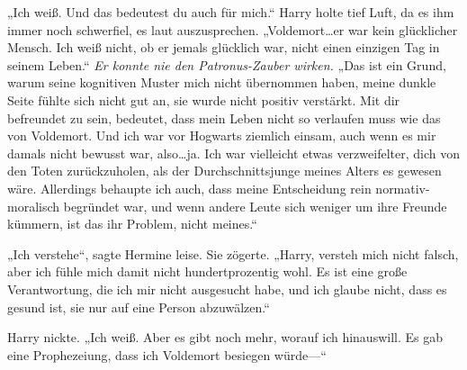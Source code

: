„Ich weiß. Und das bedeutest du auch für mich.“
Harry holte tief Luft, da es ihm immer noch schwerfiel, es laut auszusprechen.
„Voldemort…er war kein glücklicher Mensch. Ich weiß nicht, ob er jemals glücklich war, nicht einen einzigen Tag in seinem Leben.“
\emph{Er konnte nie den Patronus-Zauber wirken.}
„Das ist ein Grund, warum seine kognitiven Muster mich nicht übernommen haben, meine dunkle Seite fühlte sich nicht gut an, sie wurde nicht positiv verstärkt. Mit dir befreundet zu sein, bedeutet, dass mein Leben nicht so verlaufen muss wie das von Voldemort. Und ich war vor Hogwarts ziemlich einsam, auch wenn es mir damals nicht bewusst war, also…ja. Ich war vielleicht etwas verzweifelter, dich von den Toten zurückzuholen, als der Durchschnittsjunge meines Alters es gewesen wäre. Allerdings behaupte ich auch, dass meine Entscheidung rein normativ-moralisch begründet war, und wenn andere Leute sich weniger um ihre Freunde kümmern, ist das ihr Problem, nicht meines.“

„Ich verstehe“, sagte Hermine leise. Sie zögerte. „Harry, versteh mich nicht falsch, aber ich fühle mich damit nicht hundertprozentig wohl. Es ist eine große Verantwortung, die ich mir nicht ausgesucht habe, und ich glaube nicht, dass es gesund ist, sie nur auf eine Person abzuwälzen.“

Harry nickte.
„Ich weiß. Aber es gibt noch mehr, worauf ich hinauswill. Es gab eine Prophezeiung, dass ich Voldemort besiegen würde—“

